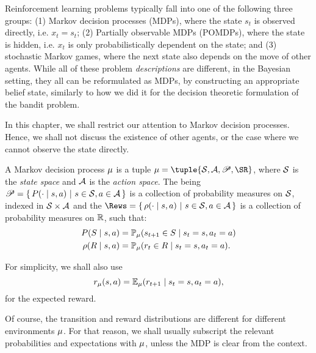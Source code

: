 Reinforcement learning problems typically fall into one of the
following three groups: (1) Markov decision processes (MDPs), where
the state $s_t$ is observed directly, i.e. $x_t = s_t$; (2) Partially
observable MDPs (POMDPs), where the state is hidden, i.e. $x_t$ is
only probabilistically dependent on the state; and (3) stochastic
Markov games, where the next state also depends on the move of other
agents. While all of these problem \emph{descriptions} are different,
in the Bayesian setting, they all can be reformulated as MDPs, by
constructing an appropriate belief state, similarly to how we did it
for the decision theoretic formulation of the bandit problem.

In this chapter, we shall restrict our attention to Markov decision processes. Hence, we shall not discuss the existence of other agents, or the case where we cannot observe the state directly. 
\begin{definition}
  A Markov decision process $\mu$ is a tuple $\mdp = \tuple{\CS, \CA, \SP, \SR}$, where ${\mathcal{S}}$ is the \emph{state space} and ${\mathcal{A}}$ is the \emph{action space}. The  being $\mathscr{P} = \left\{\, P(\cdot \mid s,a) ~\middle|~ s \in {\mathcal{S}}, a \in {\mathcal{A}} \,\right\}$ is a collection of probability measures on ${\mathcal{S}}$, indexed in ${\mathcal{S}} \times {\mathcal{A}}$ and the   $\Rews = \cset{\Rew(\cdot \mid s,a)}{s \in \CS, a \in \CA}$ is a collection of probability measures on ${\mathbb{R}}$, such that:  
  \begin{align}
    P(S \mid s, a) &= \mathop{\mbox{\ensuremath{\mathbb{P}}}}\nolimits_\mu(s_{t+1} \in S \mid s_t =s, a_t = a)
    \\
    \rho(R \mid s, a) &= \mathop{\mbox{\ensuremath{\mathbb{P}}}}\nolimits_\mu(r_{t} \in R \mid s_t =s, a_t = a).
  \end{align}
  \label{def:MDP}
\end{definition}
For simplicity, we shall also use
\begin{equation}
  \label{eq:expected-reward}
  r_\mu(s,a) = \mathop{\mbox{\ensuremath{\mathbb{E}}}}\nolimits_\mu(r_{t+1} \mid s_t = s, a_t = a),
\end{equation}
for the expected reward.

Of course, the transition and reward distributions are different
for different environments $\mu$. For that reason, we shall
usually subscript the relevant probabilities and expectations with
$\mu$, unless the MDP is clear from the context.


